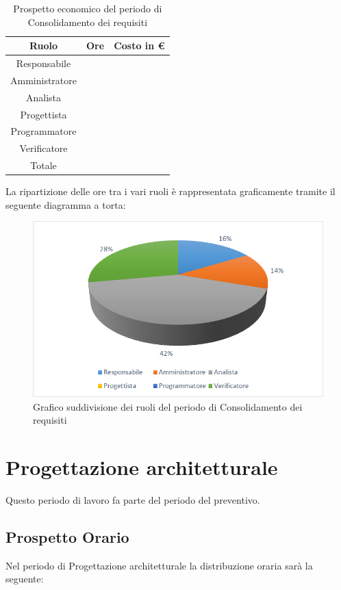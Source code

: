 \documentclass[./PianodiProgetto.tex]{subfiles}
\begin{document}
\begin{table}[H]
	\centering
	\begin{tabular}{|c|c|c|}
		\hline
		Ruolo&Ore&Costo in € \\ \hline
		Responsabile& &  \\ \hline
		Amministratore& &  \\ \hline
		Analista& &  \\ \hline
		Progettista& &  \\ \hline
		Programmatore& &  \\ \hline
		Verificatore& &  \\ \hline
		Totale& & \\ \hline
	\end{tabular}
	\caption{Prospetto economico del periodo di Consolidamento dei requisiti}
\end{table}

La ripartizione delle ore tra i vari ruoli è rappresentata graficamente tramite il seguente diagramma a torta:
\begin{figure}[H]
	\centering
	\includegraphics[width=1\linewidth]{img/grafici/ConsolidamentoRequisitiProspettoEconomico}
	\caption{Grafico suddivisione dei ruoli del periodo di Consolidamento dei requisiti}
	\label{fig:consolidamento-requisiti-prospetto-economico}
\end{figure}

\section{Progettazione architetturale}
Questo periodo di lavoro fa parte del periodo del preventivo.
\subsection{Prospetto Orario}
Nel periodo di Progettazione architetturale la distribuzione oraria sarà la seguente:
\end{document}
